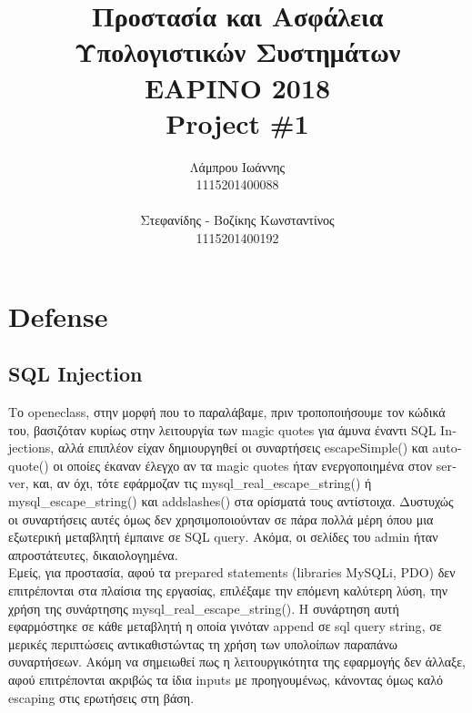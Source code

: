 \documentclass{article}
\begin{document}
\title{\vspace{-3.5cm}\textbf{Προστασία και Ασφάλεια Υπολογιστικών Συστημάτων \\ΕΑΡΙΝΟ 2018\\ \textlatin{Project \#}1}}
\author{Λάμπρου Ιωάννης \\1115201400088\\\\ Στεφανίδης - Βοζίκης Κωνσταντίνος \\1115201400192}

\maketitle
\section*{\textlatin{Defense}}
\subsection*{\textlatin{SQL Injection}}
Το \textlatin{openeclass}, στην μορφή που το παραλάβαμε, πριν τροποποιήσουμε τον κώδικά του, 
βασιζόταν κυρίως στην λειτουργία των \textlatin{magic quotes} για άμυνα έναντι \textlatin{SQL Injections},
αλλά επιπλέον είχαν δημιουργηθεί οι συναρτήσεις \textlatin{escapeSimple()} και \textlatin{autoquote()} οι
οποίες έκαναν έλεγχο αν τα \textlatin{magic quotes} ήταν ενεργοποιημένα στον \textlatin{server}, και, αν
όχι, τότε εφάρμοζαν τις \textlatin{mysql\_real\_escape\_string()} ή \textlatin{mysql\_escape\_string()} και
\textlatin{addslashes()} στα ορίσματά τους αντίστοιχα. Δυστυχώς οι συναρτήσεις αυτές όμως δεν
χρησιμοποιούνταν σε πάρα πολλά μέρη όπου μια εξωτερική μεταβλητή
έμπαινε σε \textlatin{SQL query}. Ακόμα, οι σελίδες του \textlatin{admin} ήταν απροστάτευτες, δικαιολογημένα.\\
Εμείς, για προστασία, αφού τα \textlatin{prepared statements (libraries MySQLi, PDO)} δεν επιτρέπονται στα
πλαίσια της εργασίας, επιλέξαμε την επόμενη καλύτερη λύση, την χρήση της συνάρτησης
\textlatin{mysql\_real\_escape\_string()}.
Η συνάρτηση αυτή εφαρμόστηκε σε κάθε μεταβλητή η οποία γινόταν \textlatin{append}
σε \textlatin{sql query string}, σε μερικές περιπτώσεις αντικαθιστώντας τη χρήση των υπολοίπων παραπάνω
συναρτήσεων. Ακόμη να σημειωθεί πως η λειτουργικότητα της εφαρμογής δεν άλλαξε, αφού επιτρέπονται ακριβώς τα ίδια \textlatin{inputs} με προηγουμένως, κάνοντας όμως καλό \textlatin{escaping} στις ερωτήσεις στη βάση.
\end{document}
